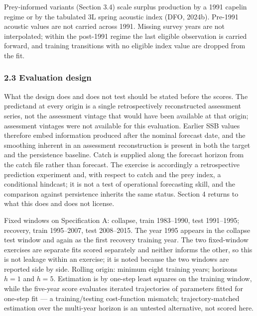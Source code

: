 \documentclass[11pt]{article}
\begin{document}
Prey-informed variants (Section 3.4) scale surplus production by a 1991
capelin regime or by the tabulated 3L spring acoustic index (DFO,
2024b). Pre-1991 acoustic values are not carried across 1991. Missing
survey years are not interpolated; within the post-1991 regime the last
eligible observation is carried forward, and training transitions with
no eligible index value are dropped from the fit.

\subsubsection{2.3 Evaluation design}\label{evaluation-design}

What the design does and does not test should be stated before the
scores. The predictand at every origin is a single retrospectively
reconstructed assessment series, not the assessment vintage that would
have been available at that origin; assessment vintages were not available for this
evaluation. Earlier SSB values therefore embed information produced
after the nominal forecast date, and the smoothing inherent in an
assessment reconstruction is present in both the target and the
persistence baseline. Catch is supplied along the forecast horizon from
the catch file rather than forecast. The exercise is accordingly
a retrospective prediction experiment and, with respect to catch and the
prey index, a conditional hindcast; it is not a test of operational
forecasting skill, and the comparison against persistence inherits the
same status. Section 4 returns to what this does and does not license.

Fixed windows on Specification A: collapse, train 1983--1990, test
1991--1995; recovery, train 1995--2007, test 2008--2015. The year 1995
appears in the collapse test window and again as the first recovery
training year. The two fixed-window exercises are separate fits scored
separately and neither informs the other, so this is not leakage within
an exercise; it is noted because the two windows are reported side by
side. Rolling origin:
minimum eight training years; horizons \(h=1\) and \(h=5\). Estimation
is by one-step least squares on the training window, while the five-year
score evaluates iterated trajectories of parameters fitted for one-step
fit --- a training/testing cost-function mismatch;
trajectory-matched estimation over the multi-year horizon is an
untested alternative, not scored here.
\end{document}
